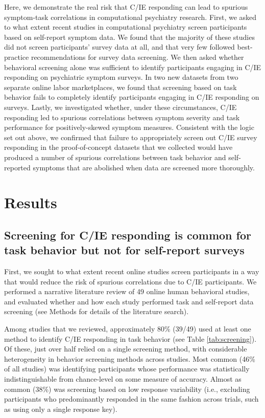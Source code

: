 \documentclass[a4paper,notitlepage,12pt]{article}
\begin{document}
\begin{refsection}[main]
Here, we demonstrate the real risk that C/IE responding can lead to spurious symptom-task correlations in computational psychiatry research. First, we asked to what extent recent studies in computational psychiatry screen participants based on self-report symptom data. We found that the majority of these studies did not screen participants' survey data at all, and that very few followed best-practice recommendations for survey data screening. We then asked whether behavioral screening alone was sufficient to identify participants engaging in C/IE responding on psychiatric symptom surveys. In two new datasets from two separate online labor marketplaces, we found that screening based on task behavior fails to completely identify participants engaging in C/IE responding on surveys. Lastly, we investigated whether, under these circumstances, C/IE responding led to spurious correlations between symptom severity and task performance for positively-skewed symptom measures. Consistent with the logic set out above, we confirmed that failure to appropriately screen out C/IE survey responding in the proof-of-concept datasets that we collected would have produced a number of spurious correlations between task behavior and self-reported symptoms that are abolished when data are screened more thoroughly.

\section*{Results}

\subsection*{Screening for C/IE responding is common for task behavior but not for self-report surveys}

First, we sought to what extent recent online studies screen participants in a way that would reduce the risk of spurious correlations due to C/IE participants. We performed a narrative literature review of 49 online human behavioral studies, and evaluated whether and how each study performed task and self-report data screening (see Methods for details of the literature search).

Among studies that we reviewed, approximately 80\% (39/49) used at least one method to identify C/IE responding in task behavior (see Table \ref{tab:screening}). Of these, just over half relied on a single screening method, with considerable heterogeneity in behavior screening methods across studies. Most common (46\% of all studies) was identifying participants whose performance was statistically indistinguishable from chance-level on some measure of accuracy. Almost as common (38\%) was screening based on low response variability (i.e., excluding participants who predominantly responded in the same fashion across trials, such as using only a single response key).


\end{refsection}
\end{document}
